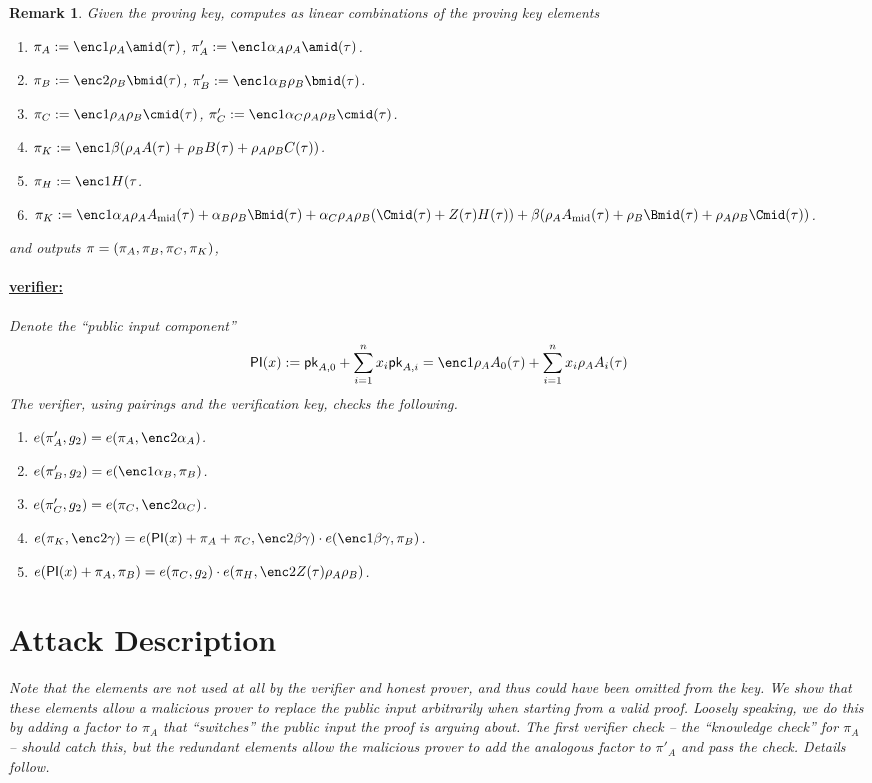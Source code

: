 \documentclass[11pt]{article}
\numberwithin{figure}{section} %
\newtheorem{remark}[thm]{Remark}
\begin{document}
\begin{remark}
Given the proving key, \per computes as linear combinations of the proving key elements
\begin{enumerate}
\item $\pi_A\defeq \enc1{\rho_A \amid(\tau)}$, $\pi'_A\defeq \enc1{\alpha_A\rho_A \amid(\tau)}$.
\item $\pi_B\defeq \enc2{\rho_B \bmid(\tau)}$, $\pi'_B \defeq \enc1{\alpha_B\rho_B \bmid(\tau)}$.
\item $\pi_C\defeq \enc1{\rho_A\rho_B \cmid(\tau)}$, $\pi'_C \defeq \enc1{\alpha_C\rho_A\rho_B \cmid(\tau)}$.

\item $\pi_K\defeq \enc1{\beta(\rho_A A(\tau) + \rho_B B(\tau) + \rho_A\rho_B C(\tau))}$.
\item $\pi_H\defeq \enc1{H(\tau}$.
\item $\pi_K\defeq \enc1{\alpha_A \rho_A\Amid(\tau) + \alpha_B \rho_B\Bmid(\tau) + \alpha_C\rho_A\rho_B(\Cmid(\tau)+ Z(\tau)H(\tau))+ \beta(\rho_A\Amid(\tau)+\rho_B\Bmid(\tau) + \rho_A\rho_B\Cmid(\tau))}$.
\end{enumerate}
 and outputs $\pi = (\pi_A,\pi_B,\pi_C,\pi_K)$,
 

\paragraph{\underline{\bctv verifier:}\\}
Denote the ``public input component'' 
\[ \PI(x) \defeq \pk_{A,0} + \sum_{i=1}^n x_i \pk_{A,i} = \enc1{\rho_A A_0(\tau) + \sum_{i=1}^n x_i \rho_A A_i(\tau) }\]
 The verifier, using pairings and the verification key, checks the following.
\begin{enumerate}
 \item $e(\pi'_A,g_2)=e(\pi_A,\enc2{\alpha_A})$.
\item $e(\pi'_B, g_2)=e(\enc1{\alpha_B},\pi_B)$.
\item $e(\pi'_C,g_2)=e(\pi_C,\enc2{\alpha_C})$.
\item $e(\pi_K,\enc2{\gamma})=e(\PI(x)+\pi_A+\pi_C,\enc2{\beta\gamma})\cdot e(\enc1{\beta\gamma},\pi_B)$.
\item $e(\PI(x)+\pi_A,\pi_B)= e(\pi_C,g_2)\cdot e(\pi_H,\enc2{Z(\tau)\rho_A\rho_B})$.
 \end{enumerate}
 
 \section{Attack Description}\label{sec:attack}
 Note that the elements  are not used at all by the verifier and honest prover, and thus could have been omitted from the key. We show that these elements allow a malicious prover to replace the public input arbitrarily when starting from a valid proof.
 Loosely speaking, we do this by adding a factor to $\pi_A$ that ``switches'' the public input the proof is arguing about.
 The first verifier check -- the ``knowledge check'' for $\pi_A$ -- should catch this, but the redundant elements allow the malicious prover to add
 the analogous factor to $\pi'_A$ and pass the check. Details follow.
 

\end{remark}
\end{document}
